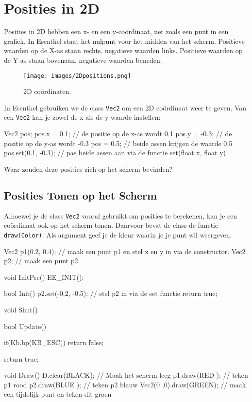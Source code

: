 \chapter{Posities in 2D}
\label{chapter:positions}

Posities in 2D hebben een x- en een y-co\"ordinaat, net zoals een punt in een grafiek. In Esenthel staat het nulpunt voor het midden van het scherm. Positieve waarden op de X-as staan rechts, negatieve waarden links. Positieve waarden op de Y-as staan bovenaan, negatieve waarden beneden.

\begin{figure}[h]
\centering
\texttt{[image: images/2Dpositions.png]}
\caption[]{2D co\"ordinaten.}
\label{fig:pos2D}
\end{figure}

In Esenthel gebruiken we de class \texttt{Vec2} om een 2D co\"ordinaat weer te geven. Van een \texttt{Vec2} kan je zowel de x als de y waarde instellen:

\begin{code}
Vec2 pos;
pos.x =  0.1; // de positie op de x-as wordt 0.1
pos.y = -0.3; // de positie op de y-as wordt -0.3
pos   =  0.5; // beide assen krijgen de waarde 0.5
pos.set(0.1, -0.3); // pas beide assen aan via de functie set(float x, float y)
\end{code}

\begin{exercise}
Waar zouden deze posities zich op het scherm bevinden?
\end{exercise}

\section{Posities Tonen op het Scherm}

Alhoewel je de class \texttt{Vec2} vooral gebruikt om posities te berekenen, kan je een co\"ordinaat ook op het scherm tonen. Daarvoor bevat de class de functie \texttt{draw(Color)}. Als argument geef je de kleur waarin je je punt wil weergeven. 

\begin{code}
Vec2 p1(0.2, 0.4); // maak een punt p1 en stel x en y in via de constructor.
Vec2 p2;           // maak een punt p2.

void InitPre()
{
   EE_INIT();
}

bool Init()
{
   p2.set(-0.2, -0.5); // stel p2 in via de set functie
   return true;
}

void Shut() {}

bool Update()
{
   if(Kb.bp(KB_ESC)) return false;
   
   return true;
}

void Draw()
{
   D.clear(BLACK); // Maak het scherm leeg
   p1.draw(RED  ); // teken p1 rood  
   p2.draw(BLUE ); // teken p2 blauw
   Vec2(0 ,0).draw(GREEN); // maak een tijdelijk punt en teken dit groen
}

\end{code}

